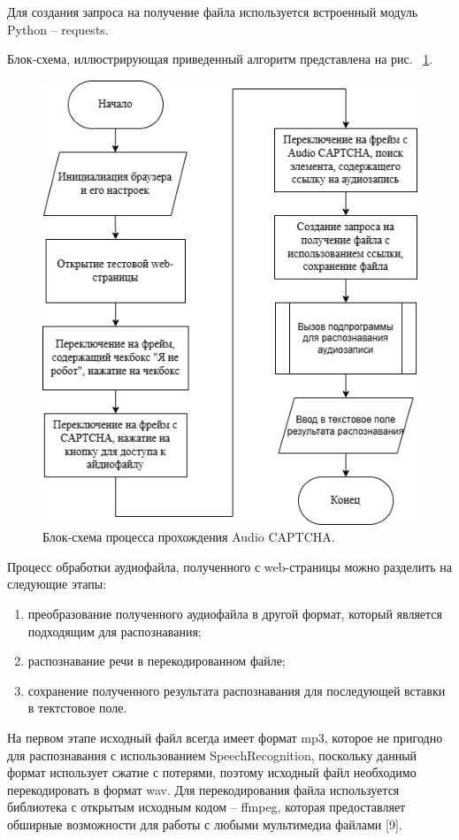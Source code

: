 Для создания запроса на получение файла используется встроенный модуль Python -- 
requests.

Блок-схема, иллюстрирующая приведенный алгоритм представлена на рис.~
\ref{fig:audio-solver}.

\begin{figure}[H]
    \centering
    \includegraphics[width=0.6\linewidth]{imgs/audiocaptcha/captcha_solve.png}
    \caption{Блок-схема процесса прохождения Audio CAPTCHA.}
    \label{fig:audio-solver}
\end{figure}

Процесс обработки аудиофайла, полученного с web-страницы можно разделить на 
следующие этапы:

\begin{enumerate}
    \item преобразование полученного аудиофайла в другой формат, который является 
    подходящим для распознавания;
    \item распознавание речи в перекодированном файле;
    \item сохранение полученного результата распознавания для последующей вставки 
    в тектстовое поле.
\end{enumerate}

На первом этапе исходный файл всегда имеет формат mp3, которое не пригодно для 
распознавания с использованием SpeechRecognition, поскольку данный формат 
использует сжатие с потерями, поэтому исходный файл необходимо перекодировать в 
формат wav. Для перекодирования файла используется библиотека с открытым исходным 
кодом -- ffmpeg, которая предоставляет обширные возможности для работы с любыми 
мультимедиа файлами [9].

